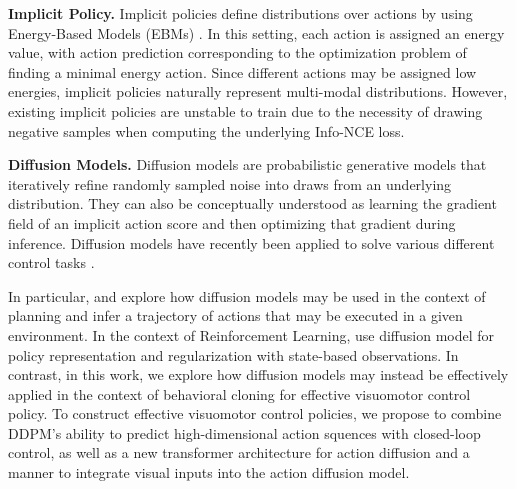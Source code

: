 \textbf{Implicit Policy.}
Implicit policies \citep{ibc, jarrett2020strictly} define distributions over actions by using Energy-Based Models (EBMs) \citep{lecun06atutorial, du2019implicit, dai2019exponential, grathwohl2020stein, du2020improved}. 
In this setting, each action is assigned an energy value, with action prediction corresponding to the optimization problem of finding a minimal energy action. Since different actions may be assigned low energies, implicit policies naturally represent multi-modal distributions. However, existing implicit policies \citep{ibc} are unstable to train due to the necessity of drawing negative samples when computing the underlying Info-NCE loss. 





























\textbf{Diffusion Models.}
Diffusion models are probabilistic generative models that iteratively refine randomly sampled noise into draws from an underlying distribution. They can also be conceptually understood as learning the gradient field of an implicit action score and then optimizing that gradient during inference.
Diffusion models \citep{sohldickstein2015nonequilibrium, ho2020denoising} have recently been applied to solve various different control tasks \citep{janner2022diffuser, urain2022se, ajay2022conditional}.


In particular, \citet{janner2022diffuser} and \citet{huang2023diffusion} explore how diffusion models may be  used in the context of planning and infer a trajectory of actions that may be executed in a given environment. 
In the context of Reinforcement Learning, \citet{wang2022diffusion} use diffusion model for policy representation and regularization with state-based observations.
In contrast, in this work, we explore how diffusion models may instead be effectively applied in the context of behavioral cloning for effective visuomotor control policy. 
To construct effective visuomotor control policies, we propose to combine DDPM's ability to predict high-dimensional action squences with closed-loop control, as well as a new transformer architecture for action diffusion and a manner to integrate visual inputs into the action diffusion model.

